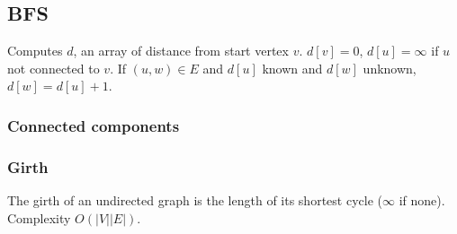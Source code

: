 \subsection{BFS}
Computes $d$, an array of distance from start vertex $v$.
$d[v]=0$, $d[u]=\infty$ if $u$ not connected to $v$. If $(u, w)\in E$ and $d[u]$ known and $d[w]$ unknown, $d[w] = d[u]+1$.


\subsubsection{Connected components}


\subsubsection{Girth}
The girth of an undirected graph is the length of its shortest cycle ($\infty$ if none). Complexity $O(|V| |E|)$.

